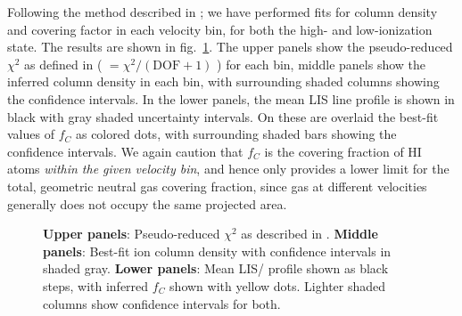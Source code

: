\documentclass[preprint2]{aastex6}
\begin{document}
Following the method described in \citet{RiveraThorsen2015}; we have
performed fits for column density and covering factor in each velocity
bin, for both the high- and low-ionization state. The results are shown
in fig.~\ref{fig:WithColDens}. The upper panels show the pseudo-reduced
$\chi^2$ as defined in \citet{RiveraThorsen2015} (
$=\chi^2 / (\mathrm{DOF} + 1)$ ) for each bin, middle panels show the
inferred column density in each bin, with surrounding shaded columns
showing the confidence intervals. In the lower panels, the mean LIS line
profile is shown in black with gray shaded uncertainty intervals. On
these are overlaid the best-fit values of $f_C$ as colored dots, with
surrounding shaded bars showing the confidence intervals. We again
caution that $f_C$ is the covering fraction of HI atoms \emph{within the
given velocity bin}, and hence only provides a lower limit for the
total, geometric neutral gas covering fraction, since gas at different
velocities generally does not occupy the same projected area.

\begin{figure}
\centering
{}
\caption{\textbf{Upper panels}: Pseudo-reduced $\chi^2$ as described in
\citet{RiveraThorsen2015}. \textbf{Middle panels}: Best-fit ion column
density with confidence intervals in shaded gray. \textbf{Lower panels}:
Mean LIS/ profile shown as black steps, with inferred $f_C$
shown with yellow dots. Lighter shaded columns show confidence intervals
for both.}\label{fig:WithColDens}
\end{figure}
\end{document}
